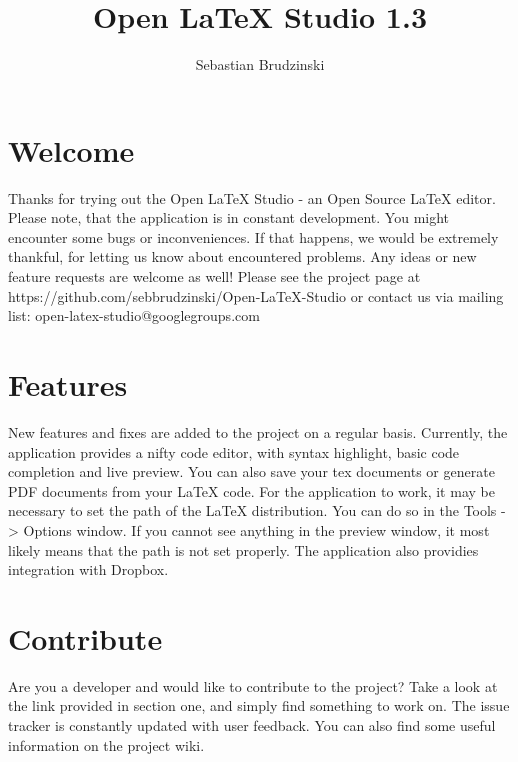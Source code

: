 \documentclass[12pt]{article}
\title{Open \LaTeX{} Studio 1.3}
\date{}
\author{Sebastian Brudzinski}
\begin{document}
  \maketitle
  \section{Welcome}
  Thanks for trying out the Open \LaTeX{} Studio - an Open Source \LaTeX{} editor. Please note, that the
  application is in constant development. You might encounter some bugs or inconveniences. If that happens, 
  we would be extremely thankful, for letting us know about encountered problems. Any ideas or new feature
  requests are welcome as well! Please see the project page at 
  https://github.com/sebbrudzinski/Open-LaTeX-Studio
  or contact us via mailing list: open-latex-studio@googlegroups.com

  \section{Features}
  New features and fixes are added to the project on a regular basis. Currently, the application provides
  a nifty code editor, with syntax highlight, basic code completion and live preview. You can also save your tex 
  documents or generate PDF documents from your \LaTeX{} code. For the application to work, it may be necessary to 
  set the path of the LaTeX distribution. You can do so in the Tools -> Options window. If you cannot see anything in the preview window, it most likely means that
  the path is not set properly. The application also providies integration with Dropbox. 

  \section{Contribute}
  Are you a developer and would like to contribute to the project? Take a look at the link provided in section one, 
  and simply find something to work on. The issue tracker is constantly updated with user feedback. You can also
  find some useful information on the project wiki.
\end{document}
